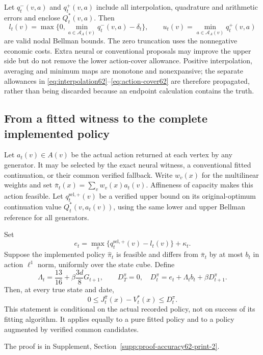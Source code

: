 Let $q_t^-(v,a)$ and $q_t^+(v,a)$ include all interpolation, quadrature and arithmetic errors and enclose $Q_t^*(v,a)$. Then
\begin{equation}\label{eq:nodal62}
 l_t(v)=\max\{0,\min_{a\in\mathcal A_A(v)}q_t^-(v,a)-\delta_t\},
 \qquad
 u_t(v)=\min_{a\in\mathcal A_A(v)}q_t^+(v,a)
\end{equation}
are valid nodal Bellman bounds. The zero truncation uses the nonnegative economic costs. Extra neural or conventional proposals may improve the upper side but do not remove the lower action-cover allowance. Positive interpolation, averaging and minimum maps are monotone and nonexpansive; the separate allowances in \eqref{eq:interpolation62}--\eqref{eq:action-cover62} are therefore propagated, rather than being discarded because an endpoint calculation contains the truth.

\subsection{From a fitted witness to the complete implemented policy}
Let $a_t(v)\in A(v)$ be the actual action returned at each vertex by any generator. It may be selected by the exact neural witness, a conventional fitted continuation, or their common verified fallback. Write $w_v(x)$ for the multilinear weights and set $\bar\pi_t(x)=\sum_vw_v(x)a_t(v)$. Affineness of capacity makes this action feasible. Let $q_t^{\mathrm{sel},+}(v)$ be a verified upper bound on its original-optimum continuation value $Q_t^*(v,a_t(v))$, using the same lower and upper Bellman reference for all generators.

\begin{theorem}\label{thm:policy62}
Set
\[
 e_t=\max_v\{q_t^{\mathrm{sel},+}(v)-l_t(v)\}+\kappa_t.
\]
Suppose the implemented policy $\widehat\pi_t$ is feasible and differs from $\bar\pi_t$ by at most $b_t$ in action $\ell^1$ norm, uniformly over the state cube. Define
\[
 \Lambda_t=\frac{13}{16}+\beta\frac{3d}{8}G_{t+1},\qquad
 D_T^\pi=0,\quad D_t^\pi=e_t+\Lambda_tb_t+\beta D_{t+1}^\pi.
\]
Then, at every true state and date,
\[
 0\le J_t^{\widehat\pi}(x)-V_t^*(x)\le D_t^\pi.
\]
This statement is conditional on the actual recorded policy, not on success of its fitting algorithm. It applies equally to a pure fitted policy and to a policy augmented by verified common candidates.
\end{theorem}

\noindent The proof is in Supplement, Section~\ref{supp:proof-accuracy62-print-2}.


